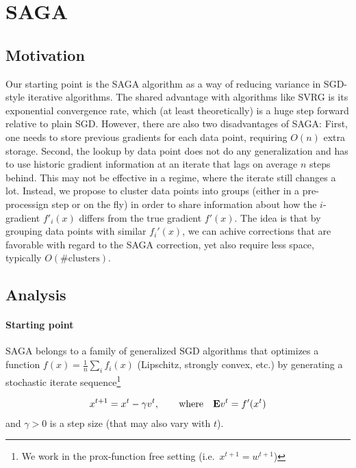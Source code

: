 \documentclass{article}
\newcommand{\E}{{\bf E}}
\begin{document}
\section*{SAGA} 
\subsection*{Motivation}

Our starting point is the SAGA algorithm as a way of reducing variance in SGD-style iterative algorithms. The shared advantage with algorithms like SVRG is its exponential convergence rate, which (at least theoretically) is a huge step forward relative to plain SGD. However, there are also two disadvantages of SAGA: First, one needs to store previous gradients for each data point, requiring $O(n)$ extra storage. Second, the lookup by data point does not do any generalization and has to use historic gradient information at an iterate that lags on average $n$ steps behind. This may not be effective in a regime, where the iterate still changes a lot. Instead, we propose to cluster data points into groups (either in a pre-processign step or on the fly) in order to share information about how the $i$-gradient $f'_i(x)$ differs from the true gradient $f'(x)$. The idea is that by grouping data points with similar $f_i'(x)$, we can achive corrections that are favorable with regard to the SAGA correction, yet also require less space, typically $O(\text{\# clusters})$.


\subsection*{Analysis}

\paragraph{Starting point} 

SAGA belongs to a family of generalized SGD algorithms that optimizes a function $f(x) = \frac 1n \sum_i f_i(x)$ (Lipschitz, strongly convex, etc.) by generating a stochastic iterate sequence\footnote{We work in the prox-function free setting (i.e.~$x^{t+1}=w^{t+1}$)}

\begin{align}
x^{t+1} = x^t - \gamma v^t, \qquad \text{where} \quad \E v^t = f'(x^t)
\end{align}
and $\gamma>0$ is a step size (that may also vary with $t$). 
\end{document}
